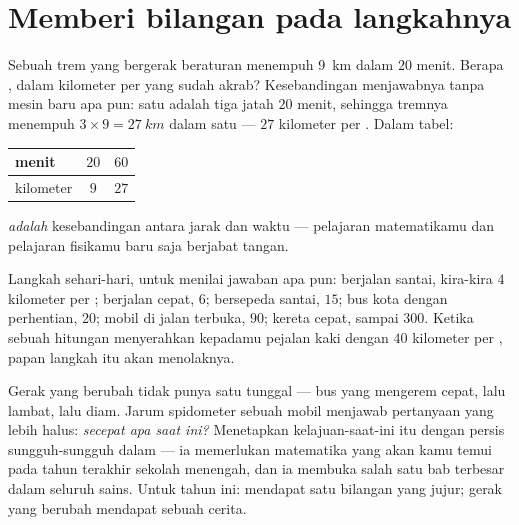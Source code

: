 \section{Memberi bilangan pada langkahnya}

\begin{example}\label{ex:g6:describing-motion:proportion}
Sebuah trem yang bergerak beraturan menempuh \qty{9}{km} dalam $20$
menit. Berapa , dalam kilometer per  yang sudah akrab?
Kesebandingan menjawabnya tanpa mesin baru apa pun: satu  adalah
tiga jatah $20$ menit, sehingga tremnya menempuh
$3 \times 9 = \qty{27}{km}$ dalam satu  ---  $27$
kilometer per .
Dalam tabel:
\begin{center}
\begin{tabular}{l|cc}
menit & $20$ & $60$ \\
\hline
kilometer & $9$ & $27$
\end{tabular}
\end{center}
 \emph{adalah} kesebandingan antara jarak dan waktu ---
pelajaran matematikamu dan pelajaran fisikamu baru saja berjabat
tangan.
\end{example}

\begin{example}\label{ex:g6:describing-motion:paces}
Langkah sehari-hari, untuk menilai jawaban apa pun: berjalan santai,
kira-kira $4$ kilometer per ; berjalan cepat, $6$; bersepeda
santai, $15$; bus kota dengan perhentian, $20$; mobil di jalan
terbuka, $90$; kereta cepat, sampai $300$. Ketika sebuah hitungan
menyerahkan kepadamu pejalan kaki dengan $40$ kilometer per , papan
langkah itu akan menolaknya.
\end{example}

\begin{remark}\label{rem:g6:describing-motion:instant}
Gerak yang berubah tidak punya satu  tunggal --- bus yang
mengerem cepat, lalu lambat, lalu diam. Jarum spidometer sebuah mobil
menjawab pertanyaan yang lebih halus: \emph{secepat apa saat ini?}
Menetapkan kelajuan-saat-ini itu dengan persis sungguh-sungguh dalam
--- ia memerlukan matematika yang akan kamu temui pada tahun terakhir
sekolah menengah, dan ia membuka salah satu bab terbesar dalam seluruh
sains. Untuk tahun ini:  mendapat satu bilangan yang
jujur; gerak yang berubah mendapat sebuah cerita.
\end{remark}

